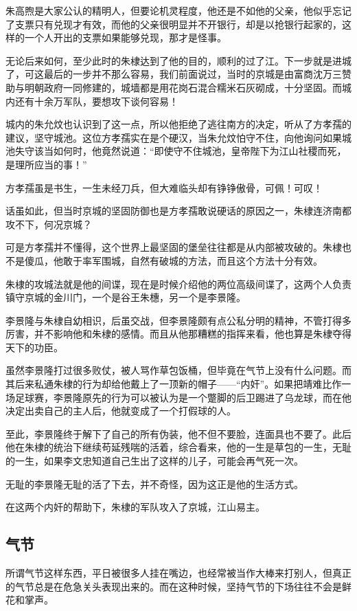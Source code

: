 \begin{multicols}{\theparacolNo}
		朱高煦是大家公认的精明人，但要论机灵程度，他还是不如他的父亲，他似乎忘记了支票只有兑现才有效，而他的父亲很明显并不开银行，却是以抢银行起家的，这样的一个人开出的支票如果能够兑现，那才是怪事。

		无论后来如何，至少此时的朱棣达到了他的目的，顺利的过了江。下一步就是进城了，可这最后的一步并不那么容易，我们前面说过，当时的京城是由富商沈万三赞助与明朝政府一同修建的，城墙都是用花岗石混合糯米石灰砌成，十分坚固。而城内还有十余万军队，要想攻下谈何容易！

		城内的朱允炆也认识到了这一点，所以他拒绝了逃往南方的决定，听从了方孝孺的建议，坚守城池。这位方孝孺实在是个硬汉，当朱允炆怕守不住，向他询问如果城池失守该当如何时，他竟然说道：“即使守不住城池，皇帝陛下为江山社稷而死，是理所应当的事！”

		方孝孺虽是书生，一生未经刀兵，但大难临头却有铮铮傲骨，可佩！可叹！

		话虽如此，但当时京城的坚固防御也是方孝孺敢说硬话的原因之一，朱棣连济南都攻不下，何况京城？

		可是方孝孺并不懂得，这个世界上最坚固的堡垒往往都是从内部被攻破的。朱棣也不是傻瓜，他敢于率军围城，自然有破城的方法，而且这个方法十分有效。

		朱棣的攻城法就是他的间谍，现在是时候介绍他的两位高级间谍了，这两个人负责镇守京城的金川门，一个是谷王朱橞，另一个是李景隆。

		李景隆与朱棣自幼相识，后虽交战，但李景隆颇有点公私分明的精神，不管打得多厉害，并不影响他和朱棣的感情。而且从他那糟糕的指挥来看，他也算是朱棣夺得天下的功臣。

		虽然李景隆打过很多败仗，被人骂作草包饭桶，但毕竟在气节上没有什么问题。而其后来私通朱棣的行为却给他戴上了一顶新的帽子——“内奸”。如果把靖难比作一场足球赛，李景隆原先的行为可以被认为是一个蹩脚的后卫踢进了乌龙球，而在他决定出卖自己的主人后，他就变成了一个打假球的人。

		至此，李景隆终于解下了自己的所有伪装，他不但不要脸，连面具也不要了。此后他在朱棣的统治下继续苟延残喘的活着，综合看来，他的一生是草包的一生，无耻的一生，如果李文忠知道自己生出了这样的儿子，可能会再气死一次。

		无耻的李景隆无耻的活了下去，并不奇怪，因为这正是他的生活方式。

		在这两个内奸的帮助下，朱棣的军队攻入了京城，江山易主。

		\subsection{气节}
		所谓气节这样东西，平日被很多人挂在嘴边，也经常被当作大棒来打别人，但真正的气节总是在危急关头表现出来的。而在这种时候，坚持气节的下场往往不会是鲜花和掌声。


\end{multicols}
